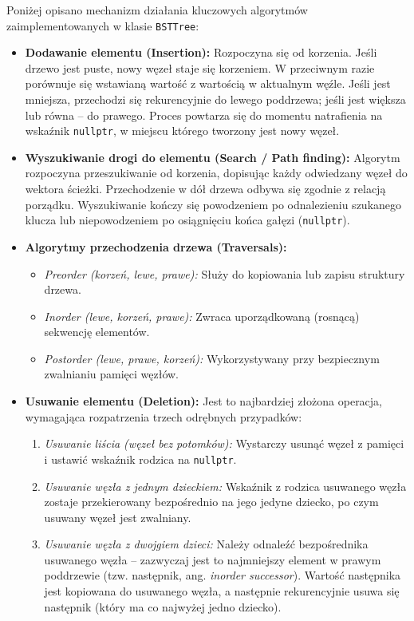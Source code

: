 \hspace{0.60cm}
Poniżej opisano mechanizm działania kluczowych algorytmów zaimplementowanych w klasie \texttt{BSTTree}:

\begin{itemize}
    \item \textbf{Dodawanie elementu (Insertion):}
    Rozpoczyna się od korzenia. Jeśli drzewo jest puste, nowy węzeł staje się korzeniem. W przeciwnym razie porównuje się wstawianą wartość z wartością w aktualnym węźle. Jeśli jest mniejsza, przechodzi się rekurencyjnie do lewego poddrzewa; jeśli jest większa lub równa -- do prawego. Proces powtarza się do momentu natrafienia na wskaźnik \texttt{nullptr}, w miejscu którego tworzony jest nowy węzeł.
    
    \item \textbf{Wyszukiwanie drogi do elementu (Search / Path finding):}
    Algorytm rozpoczyna przeszukiwanie od korzenia, dopisując każdy odwiedzany węzeł do wektora ścieżki. Przechodzenie w dół drzewa odbywa się zgodnie z relacją porządku. Wyszukiwanie kończy się powodzeniem po odnalezieniu szukanego klucza lub niepowodzeniem po osiągnięciu końca gałęzi (\texttt{nullptr}).
    
    \item \textbf{Algorytmy przechodzenia drzewa (Traversals):}
    \begin{itemize}
        \item \textit{Preorder (korzeń, lewe, prawe):} Służy do kopiowania lub zapisu struktury drzewa.
        \item \textit{Inorder (lewe, korzeń, prawe):} Zwraca uporządkowaną (rosnącą) sekwencję elementów.
        \item \textit{Postorder (lewe, prawe, korzeń):} Wykorzystywany przy bezpiecznym zwalnianiu pamięci węzłów.
    \end{itemize}
    
    \item \textbf{Usuwanie elementu (Deletion):}
    Jest to najbardziej złożona operacja, wymagająca rozpatrzenia trzech odrębnych przypadków:
    \begin{enumerate}
        \item \textit{Usuwanie liścia (węzeł bez potomków):} Wystarczy usunąć węzeł z pamięci i ustawić wskaźnik rodzica na \texttt{nullptr}.
        \item \textit{Usuwanie węzła z jednym dzieckiem:} Wskaźnik z rodzica usuwanego węzła zostaje przekierowany bezpośrednio na jego jedyne dziecko, po czym usuwany węzeł jest zwalniany.
        \item \textit{Usuwanie węzła z dwojgiem dzieci:} Należy odnaleźć bezpośrednika usuwanego węzła -- zazwyczaj jest to najmniejszy element w prawym poddrzewie (tzw. następnik, ang. \textit{inorder successor}). Wartość następnika jest kopiowana do usuwanego węzła, a następnie rekurencyjnie usuwa się następnik (który ma co najwyżej jedno dziecko).
    \end{enumerate}
\end{itemize}

